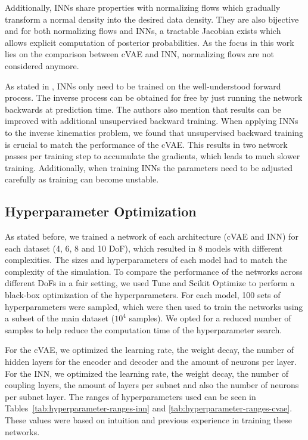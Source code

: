 \documentclass[conference]{IEEEtran}
\begin{document}
Additionally, INNs share properties with normalizing flows \cite{normalizingFlows2010, normalizingFlows2013} which gradually transform a normal density into the desired data density. They are also bijective and for both normalizing flows and INNs, a tractable Jacobian exists which allows explicit computation of posterior probabilities. As the focus in this work lies on the comparison between cVAE and INN, normalizing flows are not considered anymore.

As stated in \cite{Ardizzone2018}, INNs only need to be trained on the well-understood forward process. The inverse process can be obtained for free by just running the network backwards at prediction time. The authors also mention that results can be improved with additional unsupervised backward training. When applying INNs to the inverse kinematics problem, we found that unsupervised backward training is crucial to match the performance of the cVAE. This results in two network passes per training step to accumulate the gradients, which leads to much slower training. Additionally, when training INNs the parameters need to be adjusted carefully as training can become unstable.

\subsection*{Hyperparameter Optimization}

As stated before, we trained a network of each architecture (cVAE and INN) for each dataset (4, 6, 8 and 10 DoF), which resulted in 8 models with different complexities. The sizes and hyperparameters of each model had to match the complexity of the simulation. To compare the performance of the networks across different DoFs in a fair setting, we used Tune \cite{liaw2018tune} and Scikit Optimize \cite{scikit-optimize} to perform a black-box optimization of the hyperparameters. For each model, 100 sets of hyperparameters were sampled, which were then used to train the networks using a subset of the main dataset (\( 10^4 \) samples). We opted for a reduced number of samples to help reduce the computation time of the hyperparameter search. 

For the cVAE, we optimized the learning rate, the weight decay, the number of hidden layers for the encoder and decoder and the amount of neurons per layer. For the INN, we optimized the learning rate, the weight decay, the number of coupling layers, the amount of layers per subnet and also the number of neurons per subnet layer. The ranges of hyperparameters used can be seen in Tables~\ref{tab:hyperparameter-ranges-inn} and \ref{tab:hyperparameter-ranges-cvae}. These values were based on intuition and previous experience in training these networks.
\end{document}
